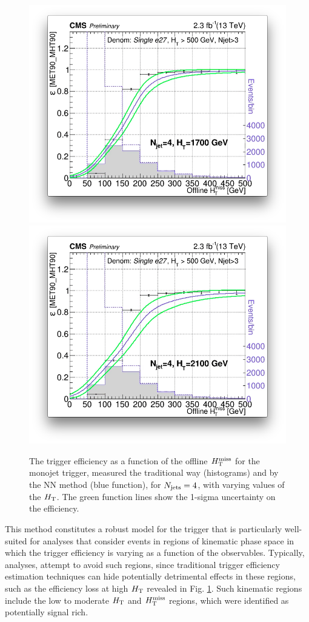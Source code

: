 \begin{figure}[tbp]
\begin{center}
        \includegraphics[width=0.49\linewidth]{figures/trigger/MonoTrigEff_Ht1700.png}
    \includegraphics[width=0.49\linewidth]{figures/trigger/MonoTrigEff_Ht2100.png}
    \caption{The trigger efficiency as a function of the offline $H_{\text{T}}^{\rm miss}$ for the monojet trigger, measured the traditional way (histograms) and by the NN method (blue function), for $N_{\rm jets}=4$, with varying values of the $H_{\rm T}$. The green function lines show the 1-sigma uncertainty on the efficiency. }
    \label{fig:mvatrigger}
  \end{center}
\end{figure}
\FloatBarrier
\noindent
This method constitutes a robust model for the trigger that is particularly well-suited for analyses that consider events in regions of kinematic phase space in which the trigger efficiency is varying as a function of the observables.  Typically, analyses, attempt to avoid such regions, since traditional trigger efficiency estimation techniques can hide potentially detrimental effects in these regions, such as the efficiency loss at high $H_{\rm T}$ revealed in Fig. \ref{fig:mvatrigger}. Such kinematic regions include the low to moderate $H_{\rm T}$ and $H_{\text{T}}^{\rm miss}$ regions, which were identified as potentially signal rich.

